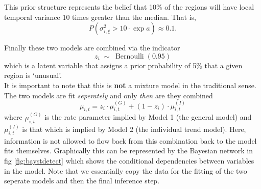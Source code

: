 \documentclass[11pt]{report}
\begin{document}
This prior structure represents the belief that 10\% of the regions will have local temporal variance 10 times greater than the median. That is,
\begin{equation*}
P(\sigma_{i, \xi}^2 > 10\cdot\exp{a}) \approx 0.1.
\end{equation*} 

Finally these two models are combined via the indicator
\begin{equation}
z_i \; \sim \; \operatorname{Bernoulli}(0.95)
\end{equation}
which is a latent variable that assigns a prior probability of 5\% that a given region is `unusual'. \\

It is important to note that this is \textbf{not} a mixture model in the traditional sense. The two models are fit \emph{seperately} and only \emph{then} are they combined
\begin{equation}
\mu_{i,t} = z_i \cdot \mu_{i,t}^{(G)} + (1 - z_i) \cdot \mu_{i,t}^{(I)}
\end{equation}
where $\mu_{i,t}^{(G)}$ is the rate parameter implied by Model 1 (the general model) and $\mu_{i,t}^{(I)}$ is that which is implied by Model 2 (the individual trend model). Here, information is not allowed to flow back from this combination back to the model fits themselves. Graphically this can be represented by the Bayesian network in fig \ref{fig:baystdetect} which shows the conditional dependencies between variables in the model. Note that we essentially copy the data for the fitting of the two seperate models and then the final inference step. \\
\end{document}
